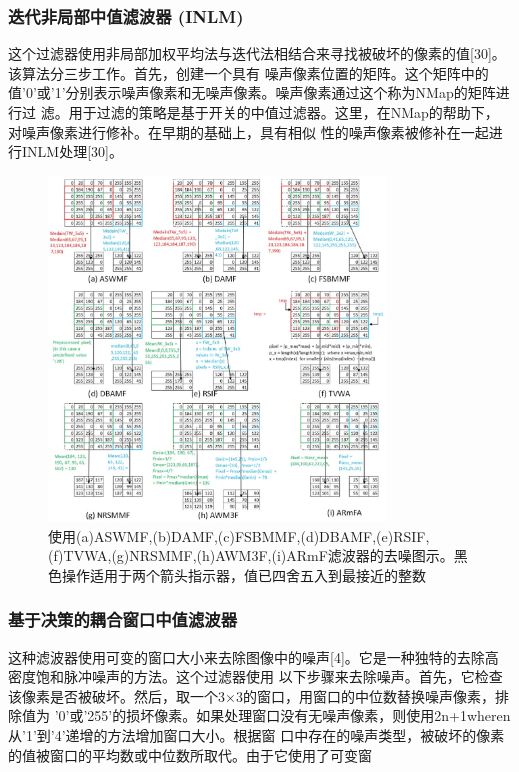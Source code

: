 \documentclass{article} %
\begin{document}
 \subsubsection{迭代非局部中值滤波器 (INLM)}
 这个过滤器使用非局部加权平均法与迭代法相结合来寻找被破坏的像素的值[30]。该算法分三步工作。首先，创建一个具有
 噪声像素位置的矩阵。这个矩阵中的值'0'或'1'分别表示噪声像素和无噪声像素。噪声像素通过这个称为NMap的矩阵进行过
 滤。用于过滤的策略是基于开关的中值过滤器。这里，在NMap的帮助下，对噪声像素进行修补。在早期的基础上，具有相似
 性的噪声像素被修补在一起进行INLM处理[30]。
 \begin{figure}[H]
    \centering
    \includegraphics[width=0.8\textwidth]{images/02.eps}
    \caption{使用(a)ASWMF,(b)DAMF,(c)FSBMMF,(d)DBAMF,(e)RSIF,(f)TVWA,(g)NRSMMF,(h)AWM3F,(i)ARmF滤波器的去噪图示。黑色操作适用于两个箭头指示器，值已四舍五入到最接近的整数}
    \label{fig:mean}
\end{figure}

\subsubsection{基于决策的耦合窗口中值滤波器}
这种滤波器使用可变的窗口大小来去除图像中的噪声[4]。它是一种独特的去除高密度饱和脉冲噪声的方法。这个过滤器使用
以下步骤来去除噪声。首先，它检查该像素是否被破坏。然后，取一个3×3的窗口，用窗口的中位数替换噪声像素，排除值为
'0'或'255'的损坏像素。如果处理窗口没有无噪声像素，则使用2n+1wheren从'1'到'4'递增的方法增加窗口大小。根据窗
口中存在的噪声类型，被破坏的像素的值被窗口的平均数或中位数所取代。由于它使用了可变窗
\end{document}
